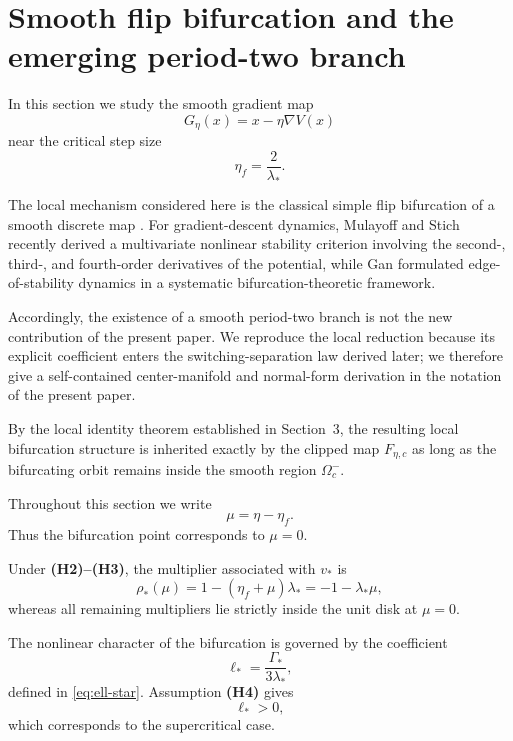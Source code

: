 
\section{Smooth flip bifurcation and the emerging period-two branch}
\label{sec:flip-bifurcation}

In this section we study the smooth gradient map
\[
G_\eta(x)=x-\eta\nabla V(x)
\]
near the critical step size
\[
\eta_f=\frac{2}{\lambda_*}.
\]

The local mechanism considered here is the classical simple flip
bifurcation of a smooth discrete map
\cite{Kuznetsov2004,GuckenheimerHolmes1983}.
For gradient-descent dynamics, Mulayoff and Stich
\cite{MulayoffStich2026} recently derived a multivariate nonlinear
stability criterion involving the second-, third-, and fourth-order
derivatives of the potential, while Gan \cite{Gan2026} formulated
edge-of-stability dynamics in a systematic bifurcation-theoretic
framework.

Accordingly, the existence of a smooth period-two branch is not the
new contribution of the present paper.  We reproduce the local
reduction because its explicit coefficient enters the
switching-separation law derived later; we therefore give a
self-contained center-manifold and normal-form derivation in the
notation of the present paper.

By the local identity theorem established in Section~3, the
resulting local bifurcation structure is inherited exactly by the
clipped map $F_{\eta,c}$ as long as the bifurcating orbit remains
inside the smooth region $\Omega_c^-$.

Throughout this section we write
\begin{equation}
\mu
=
\eta-\eta_f.
\label{eq:flip-mu}
\end{equation}
Thus the bifurcation point corresponds to $\mu=0$.

Under \textbf{(H2)--(H3)}, the multiplier associated with $v_*$ is
\begin{equation}
\rho_*(\mu)
=
1-(\eta_f+\mu)\lambda_*
=
-1-\lambda_*\mu,
\label{eq:critical-multiplier-mu}
\end{equation}
whereas all remaining multipliers lie strictly inside the unit disk
at $\mu=0$.

The nonlinear character of the bifurcation is governed by the
coefficient
\[
\ell_*
=
\frac{\Gamma_*}{3\lambda_*},
\]
defined in \eqref{eq:ell-star}.  Assumption \textbf{(H4)} gives
\[
\ell_*>0,
\]
which corresponds to the supercritical case.

